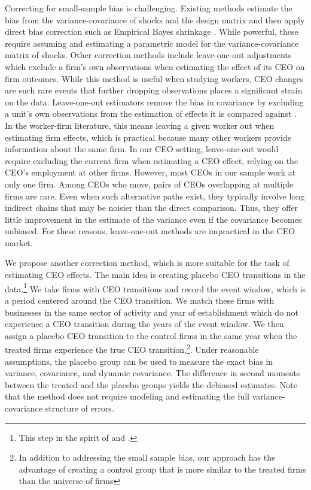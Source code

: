 \documentclass[11pt,a4paper]{article}
\begin{document}
Correcting for small-sample bias is challenging. Existing methods estimate the bias from the variance-covariance of shocks and the design matrix and then apply direct bias correction such as Empirical Bayes shrinkage \citep{andrews2008high,Bonhomme2019-xi,Bonhomme2023-dx,kline2024firm}. While powerful, these require assuming and estimating a parametric model for the variance-covariance matrix of shocks. Other correction methods include leave-one-out adjustments \citep{kline2020leave} which exclude a firm's own observations when estimating the effect of its CEO on firm outcomes. While this method is useful when studying workers, CEO changes are such rare events that further dropping observations places a significant strain on the data. Leave-one-out estimators remove the bias in covariance by excluding a unit's own observations from the estimation of effects it is compared against \citep{kline2020leave}. In the worker-firm literature, this means leaving a given worker out when estimating firm effects, which is practical because many other workers provide information about the same firm. In our CEO setting, leave-one-out would require excluding the current firm when estimating a CEO effect, relying on the CEO's employment at other firms. However, most CEOs in our sample work at only one firm. Among CEOs who move, pairs of CEOs overlapping at multiple firms are rare. Even when such alternative paths exist, they typically involve long indirect chains that may be noisier than the direct comparison. Thus, they offer little improvement in the estimate of the variance even if the covariance becomes unbiased. For these reasons, leave-one-out methods are impractical in the CEO market.


We propose another correction method, which is more suitable for the task of estimating CEO effects. The main idea is creating placebo CEO transitions in the data.\footnote{This step in the spirit of \cite{fitza2014use} and \cite{jarosiewicz2023revisiting}.} We take firms with CEO transitions and record the event window, which is a period centered around the CEO transition. We match these firms with businesses in the same sector of activity and year of establishment which do not experience a CEO transition during the years of the event window. We then assign a placebo CEO transition to the control firms in the same year when the treated firms experience the true CEO transition.\footnote{In addition to addressing the small sample bias, our approach has the advantage of creating a control group that is more similar to the treated firms than the universe of firms}. Under reasonable assumptions, the placebo group can be used to measure the exact bias in variance, covariance, and dynamic covariance. The difference in second moments between the treated and the placebo groups yields the debiased estimates. Note that the method does not require modeling and estimating the full variance-covariance structure of errors.
\end{document}

